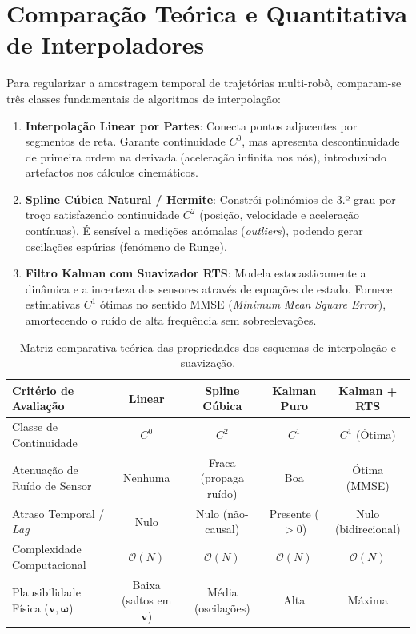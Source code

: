 \documentclass[11pt,a4paper]{article}
\newcommand{\vv}[1]{\mathbf{#1}}
\theoremstyle{definition}
\begin{document}
\section{Comparação Teórica e Quantitativa de Interpoladores}

Para regularizar a amostragem temporal de trajetórias multi-robô, comparam-se três classes fundamentais de algoritmos de interpolação:

\begin{enumerate}
    \item \textbf{Interpolação Linear por Partes}: Conecta pontos adjacentes por segmentos de reta. Garante continuidade $C^0$, mas apresenta descontinuidade de primeira ordem na derivada (aceleração infinita nos nós), introduzindo artefactos nos cálculos cinemáticos.
    \item \textbf{Spline Cúbica Natural / Hermite}: Constrói polinómios de 3.º grau por troço satisfazendo continuidade $C^2$ (posição, velocidade e aceleração contínuas). É sensível a medições anómalas (\textit{outliers}), podendo gerar oscilações espúrias (fenómeno de Runge).
    \item \textbf{Filtro Kalman com Suavizador RTS}: Modela estocasticamente a dinâmica e a incerteza dos sensores através de equações de estado. Fornece estimativas $C^1$ ótimas no sentido MMSE (\textit{Minimum Mean Square Error}), amortecendo o ruído de alta frequência sem sobreelevações.
\end{enumerate}

\begin{table}[H]
\centering
\small
\begin{tabular}{lcccc}
\toprule
\textbf{Critério de Avaliação} & \textbf{Linear} & \textbf{Spline Cúbica} & \textbf{Kalman Puro} & \textbf{Kalman + RTS} \\
\midrule
Classe de Continuidade & $C^0$ & $C^2$ & $C^1$ & $C^1$ (Ótima) \\
Atenuação de Ruído de Sensor & Nenhuma & Fraca (propaga ruído) & Boa & Ótima (MMSE) \\
Atraso Temporal / \textit{Lag} & Nulo & Nulo (não-causal) & Presente ($>0$) & Nulo (bidirecional) \\
Complexidade Computacional & $\mathcal{O}(N)$ & $\mathcal{O}(N)$ & $\mathcal{O}(N)$ & $\mathcal{O}(N)$ \\
Plausibilidade Física ($\vv{v}, \vv{\omega}$) & Baixa (saltos em $\vv{v}$) & Média (oscilações) & Alta & Máxima \\
\bottomrule
\end{tabular}
\caption{Matriz comparativa teórica das propriedades dos esquemas de interpolação e suavização.}
\end{table}
\end{document}

